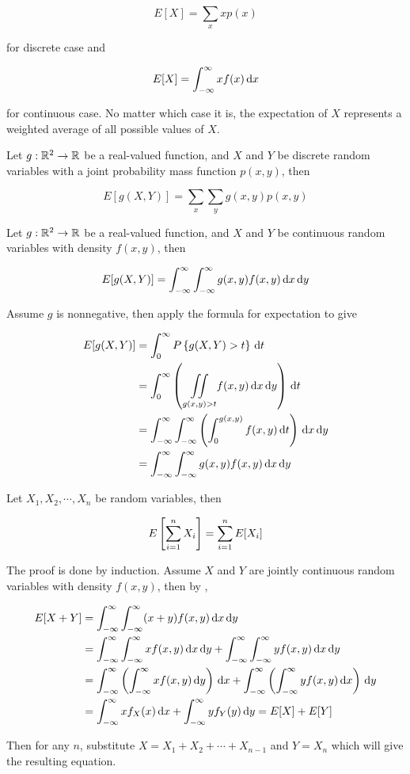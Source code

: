 \documentclass[a4paper,12pt]{article}
\begin{document}
$$E[X]=\sum_{x}xp(x)$$\s

for discrete case and

$$E[X]=\int_{-\infty}^{\infty}xf(x)\,\mathrm{d} x$$\s

for continuous case. No matter which case it is, the expectation of $X$ represents a weighted average of all possible values of $X$.\n

\begin{pst}
  Let $g:\mathbb{R}^{2}\to\mathbb{R}$ be a real-valued function, and $X$ and $Y$ be discrete random variables with a joint probability mass function $p(x,y)$, then

  $$E[g(X,Y)]=\sum_{x}\sum_{y}g(x,y)p(x,y)$$
\end{pst}\n

\begin{pst}
  Let $g:\mathbb{R}^{2}\to\mathbb{R}$ be a real-valued function, and $X$ and $Y$ be continuous random variables with density $f(x,y)$, then

  $$E[g(X,Y)]=\int_{-\infty}^{\infty}\int_{-\infty}^{\infty}g(x,y)f(x,y)\,\mathrm{d} x\,\mathrm{d} y$$\s

  \prf Assume $g$ is nonnegative, then apply the formula for expectation to give

  $$\begin{aligned}[t]
    E[g(X,Y)]&=\int_{0}^{\infty}P\left\{ g(X,Y)>t\right\}\,\mathrm{d} t\\
    &=\int_{0}^{\infty}\left( \underset{g(x,y)>t}{\iint}f(x,y)\,\mathrm{d} x\,\mathrm{d} y\right)\,\mathrm{d} t\\
    &=\int_{-\infty}^{\infty}\int_{-\infty}^{\infty}\left( \int_{0}^{g(x,y)}f(x,y)\,\mathrm{d} t\right)\,\mathrm{d} x\,\mathrm{d} y\\
    &=\int_{-\infty}^{\infty}\int_{-\infty}^{\infty}g(x,y)f(x,y)\,\mathrm{d} x\,\mathrm{d} y
  \end{aligned}$$
\end{pst}\n

\begin{crl}
  Let $X_{1},X_{2},\cdots,X_{n}$ be random variables, then

  $$E\left[ \sum_{i=1}^{n}X_{i}\right]=\sum_{i=1}^{n}E[X_{i}]$$\s

  \prf The proof is done by induction. Assume $X$ and $Y$ are jointly continuous random variables with density $f(x,y)$, then by \rpst[\sctd{0}],

  $$\begin{aligned}[t]
    E[X+Y]&=\int_{-\infty}^{\infty}\int_{-\infty}^{\infty}(x+y)f(x,y)\,\mathrm{d} x\,\mathrm{d} y\\
    &=\int_{-\infty}^{\infty}\int_{-\infty}^{\infty}xf(x,y)\,\mathrm{d} x\,\mathrm{d} y+\int_{-\infty}^{\infty}\int_{-\infty}^{\infty}yf(x,y)\,\mathrm{d} x\,\mathrm{d} y\\
    &=\int_{-\infty}^{\infty}\left( \int_{-\infty}^{\infty}xf(x,y)\,\mathrm{d} y\right)\,\mathrm{d} x+\int_{-\infty}^{\infty}\left( \int_{-\infty}^{\infty}yf(x,y)\,\mathrm{d} x\right)\,\mathrm{d} y\\
    &=\int_{-\infty}^{\infty}xf_{X}(x)\,\mathrm{d} x+\int_{-\infty}^{\infty}yf_{Y}(y)\,\mathrm{d} y=E[X]+E[Y]
  \end{aligned}$$\s

  Then for any $n$, substitute $X=X_{1}+X_{2}+\cdots+X_{n-1}$ and $Y=X_{n}$ which will give the resulting equation.
\end{crl}
\end{document}
